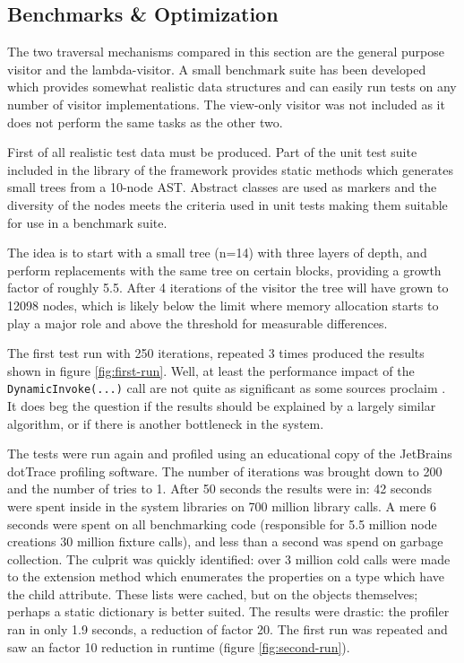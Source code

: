 \documentclass[twoside,openright]{uva-bachelor-thesis}
\newcommand{\code}[1]{\texttt{\footnotesize#1}}
\begin{document}
		\subsection{Benchmarks \& Optimization}
			The two traversal mechanisms compared in this section are the general purpose visitor and the lambda-visitor. A small benchmark suite has been developed which provides somewhat realistic data structures and can easily run tests on any number of visitor implementations. The view-only visitor was not included as it does not perform the same tasks as the other two.
			
			First of all realistic test data must be produced. Part of the unit test suite included in the library of the framework provides static methods which generates small trees from a 10-node AST. Abstract classes are used as markers and the diversity of the nodes meets the criteria used in unit tests making them suitable for use in a benchmark suite.
			
			The idea is to start with a small tree (n=14) with three layers of depth, and perform replacements with the same tree on certain blocks, providing a growth factor of roughly 5.5. After 4 iterations of the visitor the tree will have grown to 12098 nodes, which is likely below the limit where memory allocation starts to play a major role and above the threshold for measurable differences.
			
			The first test run with 250 iterations, repeated 3 times produced the results shown in figure \ref{fig:first-run}. Well, at least the performance impact of the \code{DynamicInvoke(...)} call are not quite as significant as some sources proclaim \cite{website:msdn-reflection}. It does beg the question if the results should be explained by a largely similar algorithm, or if there is another bottleneck in the system.
			
			The tests were run again and profiled using an educational copy of the JetBrains dotTrace profiling software. The number of iterations was brought down to 200 and the number of tries to 1. After 50 seconds the results were in: 42 seconds were spent inside in the system libraries on 700 million library calls. A mere 6 seconds were spent on all benchmarking code (responsible for 5.5 million node creations 30 million fixture calls), and less than a second was spend on garbage collection. The culprit was quickly identified: over 3 million cold calls were made to the extension method which enumerates the properties on a type which have the child attribute. These lists were cached, but on the objects themselves; perhaps a static dictionary is better suited. The results were drastic: the profiler ran in only 1.9 seconds, a reduction of factor 20. The first run was repeated and saw an factor 10 reduction in runtime (figure \ref{fig:second-run}).
												
\end{document}
